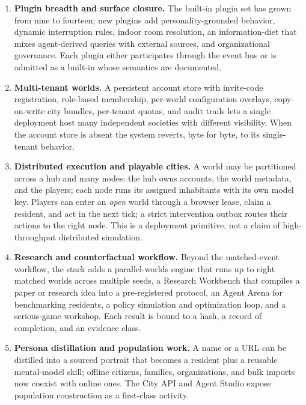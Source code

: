 \begin{enumerate}[leftmargin=*,label=\textbf{\arabic*.}]
  \item \textbf{Plugin breadth and surface closure.}  The built-in plugin set
  has grown from nine to fourteen; new plugins add personality-grounded
  behavior, dynamic interruption rules, indoor room resolution, an
  information-diet that mixes agent-derived queries with external sources, and
  organizational governance.  Each plugin either participates through the
  event bus or is admitted as a built-in whose semantics are documented.
  \item \textbf{Multi-tenant worlds.}  A persistent account store with
  invite-code registration, role-based membership, per-world configuration
  overlays, copy-on-write city bundles, per-tenant quotas, and audit trails
  lets a single deployment host many independent societies with different
  visibility.  When the account store is absent the system reverts, byte for
  byte, to its single-tenant behavior.
  \item \textbf{Distributed execution and playable cities.}  A world may be
  partitioned across a hub and many nodes: the hub owns accounts, the world
  metadata, and the players; each node runs its assigned inhabitants with its
  own model key.  Players can enter an \emph{open} world through a browser
  lease, claim a resident, and act in the next tick; a strict intervention
  outbox routes their actions to the right node.  This is a deployment
  primitive, not a claim of high-throughput distributed simulation.
  \item \textbf{Research and counterfactual workflow.}  Beyond the
  matched-event workflow, the stack adds a parallel-worlds engine that runs up
  to eight matched worlds across multiple seeds, a Research Workbench that
  compiles a paper or research idea into a pre-registered protocol, an
  Agent Arena for benchmarking residents, a policy simulation and optimization
  loop, and a serious-game workshop.  Each result is bound to a hash, a
  record of completion, and an evidence class.
  \item \textbf{Persona distillation and population work.}  A name or a URL
  can be distilled into a sourced portrait that becomes a resident plus a
  reusable mental-model skill; offline citizens, families, organizations, and
  bulk imports now coexist with online ones.  The City API and Agent Studio
  expose population construction as a first-class activity.
\end{enumerate}

